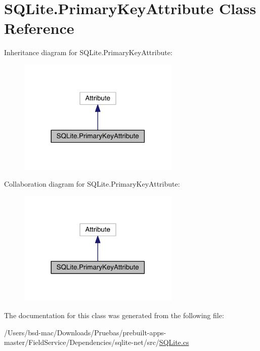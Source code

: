 \hypertarget{class_s_q_lite_1_1_primary_key_attribute}{\section{S\+Q\+Lite.\+Primary\+Key\+Attribute Class Reference}
\label{class_s_q_lite_1_1_primary_key_attribute}
}


Inheritance diagram for S\+Q\+Lite.\+Primary\+Key\+Attribute\+:
\nopagebreak
\begin{figure}[H]
\begin{center}
\leavevmode
\includegraphics[width=218pt]{class_s_q_lite_1_1_primary_key_attribute__inherit__graph}
\end{center}
\end{figure}


Collaboration diagram for S\+Q\+Lite.\+Primary\+Key\+Attribute\+:
\nopagebreak
\begin{figure}[H]
\begin{center}
\leavevmode
\includegraphics[width=218pt]{class_s_q_lite_1_1_primary_key_attribute__coll__graph}
\end{center}
\end{figure}


The documentation for this class was generated from the following file\+:\begin{DoxyCompactItemize}
\item 
/\+Users/bsd-\/mac/\+Downloads/\+Pruebas/prebuilt-\/apps-\/master/\+Field\+Service/\+Dependencies/sqlite-\/net/src/\hyperlink{_s_q_lite_8cs}{S\+Q\+Lite.\+cs}\end{DoxyCompactItemize}
